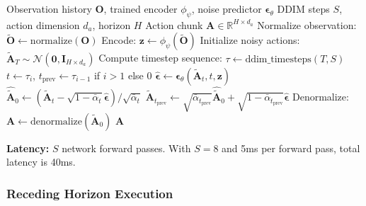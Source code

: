 \begin{algorithm}[H]
\caption{Diffusion Policy Inference (DDIM)}
\label{alg:diffusion_policy_inference}
\begin{algorithmic}[1]
\REQUIRE Observation history $\mathbf{O}$, trained encoder $\phi_\psi$, noise predictor $\boldsymbol{\epsilon}_\theta$
\REQUIRE DDIM steps $S$, action dimension $d_a$, horizon $H$
\ENSURE Action chunk $\mathbf{A} \in \mathbb{R}^{H \times d_a}$
\STATE Normalize observation: $\tilde{\mathbf{O}} \gets \text{normalize}(\mathbf{O})$
\STATE Encode: $\mathbf{z} \gets \phi_\psi(\tilde{\mathbf{O}})$
\STATE Initialize noisy actions: $\tilde{\mathbf{A}}_T \sim \mathcal{N}(\mathbf{0}, \mathbf{I}_{H \times d_a})$
\STATE Compute timestep sequence: $\tau \gets \text{ddim\_timesteps}(T, S)$
    \STATE $t \gets \tau_i$, $t_{\text{prev}} \gets \tau_{i-1}$ if $i > 1$ else $0$
    \STATE $\hat{\boldsymbol{\epsilon}} \gets \boldsymbol{\epsilon}_\theta(\tilde{\mathbf{A}}_t, t, \mathbf{z})$
    \STATE $\hat{\tilde{\mathbf{A}}}_0 \gets (\tilde{\mathbf{A}}_t - \sqrt{1-\bar{\alpha}_t}\hat{\boldsymbol{\epsilon}}) / \sqrt{\bar{\alpha}_t}$
    \STATE $\tilde{\mathbf{A}}_{t_{\text{prev}}} \gets \sqrt{\bar{\alpha}_{t_{\text{prev}}}} \hat{\tilde{\mathbf{A}}}_0 + \sqrt{1-\bar{\alpha}_{t_{\text{prev}}}} \hat{\boldsymbol{\epsilon}}$
\ENDFOR
\STATE Denormalize: $\mathbf{A} \gets \text{denormalize}(\tilde{\mathbf{A}}_0)$
\RETURN $\mathbf{A}$
\end{algorithmic}
\end{algorithm}

\textbf{Latency:} $S$ network forward passes. With $S = 8$ and 5ms per forward pass, total latency is 40ms.

\subsubsection{Receding Horizon Execution}

